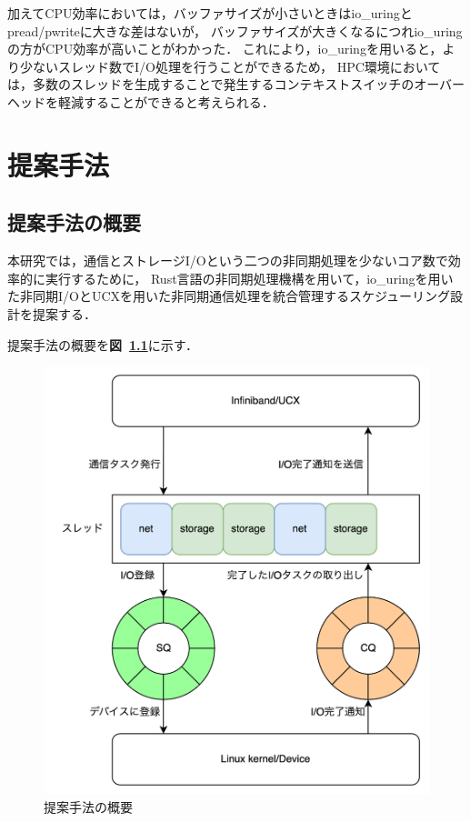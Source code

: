 \documentclass[a4paper,11pt]{jreport}
\newcommand\figref[1]{\textbf{図~\ref{fig:#1}}}
\begin{document}
加えてCPU効率においては，バッファサイズが小さいときはio\_uringとpread/pwriteに大きな差はないが，
バッファサイズが大きくなるにつれio\_uringの方がCPU効率が高いことがわかった．
これにより，io\_uringを用いると，より少ないスレッド数でI/O処理を行うことができるため，
HPC環境においては，多数のスレッドを生成することで発生するコンテキストスイッチのオーバーヘッドを軽減することができると考えられる．

\chapter{提案手法}
\section{提案手法の概要}
本研究では，通信とストレージI/Oという二つの非同期処理を少ないコア数で効率的に実行するために，
Rust言語の非同期処理機構を用いて，io\_uringを用いた非同期I/OとUCXを用いた非同期通信処理を統合管理するスケジューリング設計を提案する．

提案手法の概要を\figref{proposed}に示す．
\begin{figure}
	\centering
	\includegraphics[width=12cm, bb=0 0 2260 2505]{figures/io_net_integrate.drawio.png}
	\caption{提案手法の概要}
	\label{fig:proposed}
\end{figure}
\end{document}
